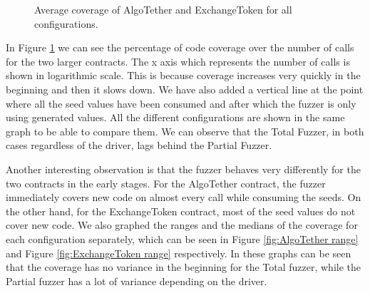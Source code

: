 \begin{figure}[htbp]
    \centering
    \hfill
    \caption{Average coverage of AlgoTether and ExchangeToken for all configurations.}
    \label{fig:percent_coverage}
\end{figure}

In Figure \ref{fig:percent_coverage} we can see the percentage of code coverage over the number of calls for the two larger contracts.
The x axis which represents the number of calls is shown in logarithmic scale.
This is because coverage increases very quickly in the beginning and then it slows down.
We have also added a vertical line at the point where all the seed values have been consumed and after which the fuzzer is only using generated values.
All the different configurations are shown in the same graph to be able to compare them.
We can observe that the Total Fuzzer, in both cases regardless of the driver, lags behind the Partial Fuzzer.

Another interesting observation is that the fuzzer behaves very differently for the two contracts in the early stages.
For the AlgoTether contract, the fuzzer immediately covers new code on almost every call while consuming the seeds.
On the other hand, for the ExchangeToken contract, most of the seed values do not cover new code.
We also graphed the ranges and the medians of the coverage for each configuration separately, which can be seen in Figure \ref{fig:AlgoTether range} and Figure \ref{fig:ExchangeToken range} respectively.
In these graphs can be seen that the coverage has no variance in the beginning for the Total fuzzer, while the Partial fuzzer has a lot of variance depending on the driver.

